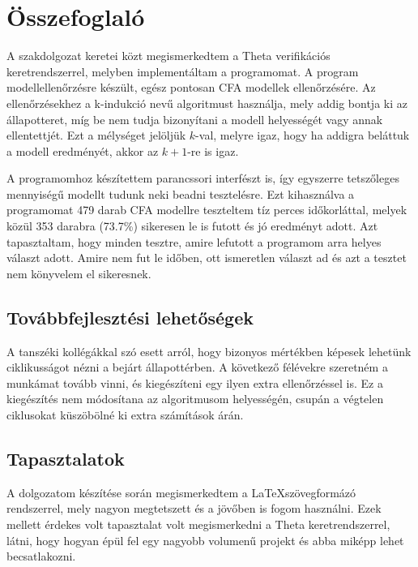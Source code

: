 \chapter{Összefoglaló}

A szakdolgozat keretei közt megismerkedtem a Theta verifikációs keretrendszerrel, melyben implementáltam a programomat. A program modellellenőrzésre készült, egész pontosan CFA modellek ellenőrzésére. Az ellenőrzésekhez a k-indukció nevű algoritmust használja, mely addig bontja ki az állapotteret, míg be nem tudja bizonyítani a modell helyességét vagy annak ellentettjét. Ezt a mélységet jelöljük $ k $-val, melyre igaz, hogy ha addigra beláttuk a modell eredményét, akkor az $ k+1 $-re is igaz.

A programomhoz készítettem parancssori interfészt is, így egyszerre tetszőleges mennyiségű modellt tudunk neki beadni tesztelésre. Ezt kihasználva a programomat 479 darab CFA modellre teszteltem tíz perces időkorláttal, melyek közül 353 darabra (73.7\%) sikeresen le is futott és jó eredményt adott. Azt tapasztaltam, hogy minden tesztre, amire lefutott a programom arra helyes választ adott. Amire nem fut le időben, ott ismeretlen választ ad és azt a tesztet nem könyvelem el sikeresnek.

\section{Továbbfejlesztési lehetőségek}

A tanszéki kollégákkal szó esett arról, hogy bizonyos mértékben képesek lehetünk ciklikusságot nézni a bejárt állapottérben. A következő félévekre szeretném a munkámat tovább vinni, és kiegészíteni egy ilyen extra ellenőrzéssel is. Ez a kiegészítés nem módosítana az algoritmusom helyességén, csupán a végtelen ciklusokat küszöbölné ki extra számítások árán.

\section{Tapasztalatok}

A dolgozatom készítése során megismerkedtem a \LaTeX szövegformázó rendszerrel, mely nagyon megtetszett és a jövőben is fogom használni. Ezek mellett érdekes volt tapasztalat volt megismerkedni a Theta keretrendszerrel, látni, hogy hogyan épül fel egy nagyobb volumenű projekt és abba miképp lehet becsatlakozni. 